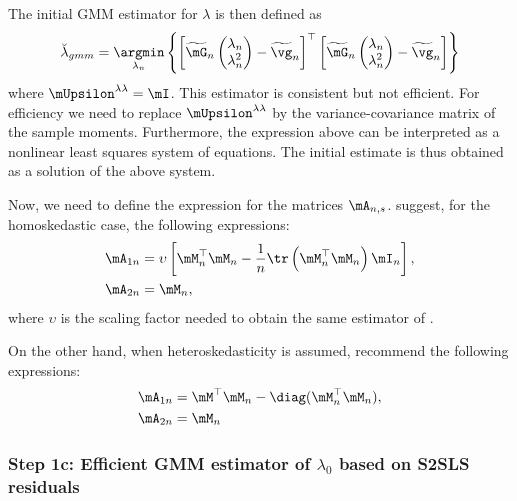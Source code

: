 \documentclass[english,12pt]{book}\usepackage[]{graphicx}\usepackage[]{xcolor}
\begin{document}
The initial GMM estimator for $\lambda$ is then defined as
\begin{equation*}
\breve{\lambda}_{gmm} = \underset{\lambda_n}{\argmin}\left\lbrace \left[\widetilde{\mG}_n\begin{pmatrix} \lambda_n \\
                \lambda^2_n
\end{pmatrix} - \widetilde{\vg}_n \right]^\top \left[\widetilde{\mG}_n\begin{pmatrix} \lambda_n \\
                \lambda^2_n
\end{pmatrix} - \widetilde{\vg}_n\right]\right\rbrace
\end{equation*}
%
where $\mUpsilon^{\lambda\lambda} = \mI$. This estimator is consistent but not efficient. For efficiency we need to replace $\mUpsilon^{\lambda\lambda}$ by the variance-covariance matrix of the sample moments. Furthermore, the expression above can be interpreted as a nonlinear least squares system of equations. The initial estimate is thus obtained as a solution of the above system. 

Now, we need to define the expression for the matrices $\mA_{n,s}$. \cite{drukker2013two} suggest, for the homoskedastic case, the following expressions:
\begin{equation*}
  \begin{aligned}
    \mA_{1n} & = \upsilon \left[\mM^\top_n\mM_n - \frac{1}{n}\tr\left(\mM^\top_n\mM_n\right)\mI_n\right],\\ 
    \mA_{2n} & = \mM_n,
  \end{aligned}
\end{equation*}
%
where $\upsilon$ is the scaling factor needed to obtain the same estimator of \cite{kelejian1998generalized, kelejian1999generalized}. 

On the other hand, when heteroskedasticity is assumed, \cite{kelejian2010specification} recommend the following expressions:
\begin{equation*}
\begin{aligned}
\mA_{1n} & = \mM^\top\mM_n  - \diag(\mM^\top_n\mM_n), \\
\mA_{2n} & = \mM_n
\end{aligned}
\end{equation*}


\subsubsection{Step 1c: Efficient GMM estimator of $\lambda_0$ based on S2SLS residuals}
\end{document}
